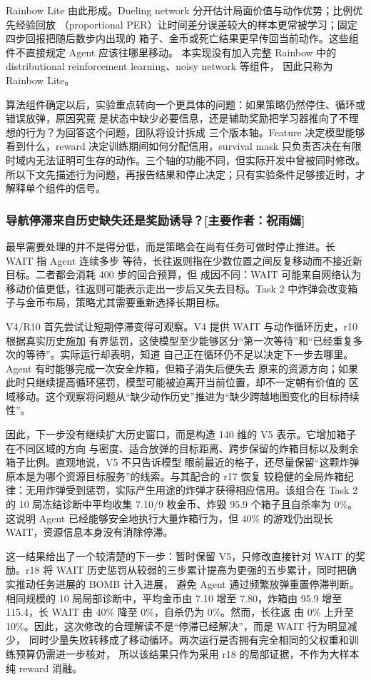 \documentclass[UTF8,11pt,a4paper,fontset=none]{ctexart}
\newcommand{\primaryauthor}[1]{\texorpdfstring{\enspace\normalfont\small[主要作者：#1]}{ [主要作者：#1]}}
\newcommand{\authorsubsubsection}[2]{\subsubsection{#1\primaryauthor{#2}}}
\begin{document}
Rainbow Lite 由此形成。Dueling network 分开估计局面价值与动作优势；比例优先经验回放
（proportional PER）让时间差分误差较大的样本更常被学习；固定四步回报把随后数步内出现的
箱子、金币或死亡结果更早传回当前动作。这些组件不直接规定 Agent 应该往哪里移动。
本实现没有加入完整 Rainbow 中的 distributional reinforcement learning、noisy network 等组件，
因此只称为 Rainbow Lite。

算法组件确定以后，实验重点转向一个更具体的问题：如果策略仍然停住、循环或错误放弹，原因究竟
是状态中缺少必要信息，还是辅助奖励把学习器推向了不理想的行为？为回答这个问题，团队将设计拆成
三个版本轴。Feature 决定模型能够看到什么，reward 决定训练期间如何分配信用，survival mask
只负责否决在有限时域内无法证明可生存的动作。三个轴的功能不同，但实际开发中曾被同时修改。
所以下文先描述行为问题，再报告结果和停止决定；只有实验条件足够接近时，才解释单个组件的信号。

\authorsubsubsection{导航停滞来自历史缺失还是奖励诱导？}{祝雨嫣}

最早需要处理的并不是得分低，而是策略会在尚有任务可做时停止推进。长 WAIT 指 Agent 连续多步
等待，长往返则指在少数位置之间反复移动而不接近新目标。二者都会消耗 400 步的回合预算，但
成因不同：WAIT 可能来自网络认为移动价值更低，往返则可能表示走出一步后又失去目标。Task 2
中炸弹会改变箱子与金币布局，策略尤其需要重新选择长期目标。

V4/R10 首先尝试让短期停滞变得可观察。V4 提供 WAIT 与动作循环历史，r10 根据真实历史施加
有界惩罚，这使模型至少能够区分“第一次等待”和“已经重复多次的等待”。实际运行却表明，知道
自己正在循环仍不足以决定下一步去哪里。Agent 有时能够完成一次安全炸箱，但箱子消失后便失去
原来的资源方向；如果此时只继续提高循环惩罚，模型可能被迫离开当前位置，却不一定朝有价值的
区域移动。这个观察将问题从“缺少动作历史”推进为“缺少跨越地图变化的目标持续性”。

因此，下一步没有继续扩大历史窗口，而是构造 140 维的 V5 表示。它增加箱子在不同区域的方向
与密度、适合放弹的目标距离、跨步保留的炸箱目标以及剩余箱子比例。直观地说，V5 不只告诉模型
眼前最近的格子，还尽量保留“这颗炸弹原本是为哪个资源目标服务”的线索。与其配合的 r17 恢复
较稳健的全局炸箱纪律：无用炸弹受到惩罚，实际产生用途的炸弹才获得相应信用。该组合在 Task 2
的 10 局冻结诊断中平均收集 7.10/9 枚金币、炸毁 95.9 个箱子且自杀率为 0\%。这说明 Agent
已经能够安全地执行大量炸箱行为，但 40\% 的游戏仍出现长 WAIT，资源信息本身没有消除停滞。

这一结果给出了一个较清楚的下一步：暂时保留 V5，只修改直接针对 WAIT 的奖励。r18 将 WAIT
历史惩罚从较弱的三步累计提高为更强的五步累计，同时把确实推动任务进展的 BOMB 计入进展，
避免 Agent 通过频繁放弹重置停滞判断。相同规模的 10 局局部诊断中，平均金币由 7.10 增至
7.80，炸箱由 95.9 增至 115.4，长 WAIT 由 40\% 降至 0\%，自杀仍为 0\%。然而，长往返
由 0\% 上升至 10\%。因此，这次修改的合理解读不是“停滞已经解决”，而是 WAIT 行为明显减少，
同时少量失败转移成了移动循环。两次运行是否拥有完全相同的父权重和训练预算仍需进一步核对，
所以该结果只作为采用 r18 的局部证据，不作为大样本纯 reward 消融。
\end{document}
